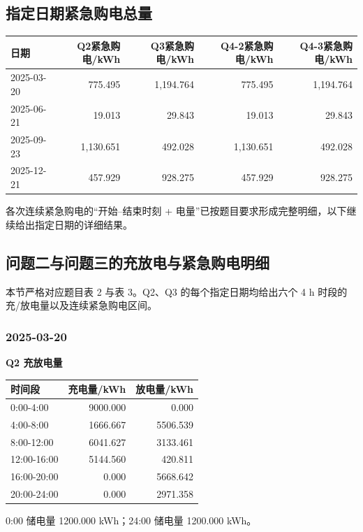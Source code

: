 \subsection{指定日期紧急购电总量}
\begin{longtable}[]{@{}lrrrr@{}}
\toprule
日期 & Q2紧急购电/kWh & Q3紧急购电/kWh & Q4-2紧急购电/kWh & Q4-3紧急购电/kWh \\
\midrule\endhead
2025-03-20 & 775.495 & 1,194.764 & 775.495 & 1,194.764 \\
2025-06-21 & 19.013 & 29.843 & 19.013 & 29.843 \\
2025-09-23 & 1,130.651 & 492.028 & 1,130.651 & 492.028 \\
2025-12-21 & 457.929 & 928.275 & 457.929 & 928.275 \\
\bottomrule\end{longtable}

各次连续紧急购电的``开始--结束时刻 + 电量''已按题目要求形成完整明细，以下继续给出指定日期的详细结果。

\subsection{问题二与问题三的充放电与紧急购电明细}
本节严格对应题目表 2 与表 3。Q2、Q3 的每个指定日期均给出六个 4 h 时段的充/放电量以及连续紧急购电区间。

\subsubsection{2025-03-20}
\textbf{Q2 充放电量}
\begin{longtable}[]{@{}lrr@{}}\toprule 时间段 & 充电量/kWh & 放电量/kWh \\\midrule\endhead
0:00-4:00 & 9000.000 & 0.000 \\
4:00-8:00 & 1666.667 & 5506.539 \\
8:00-12:00 & 6041.627 & 3133.461 \\
12:00-16:00 & 5144.560 & 420.811 \\
16:00-20:00 & 0.000 & 5668.642 \\
20:00-24:00 & 0.000 & 2971.358 \\
\bottomrule\end{longtable}
0:00 储电量 1200.000 kWh；24:00 储电量 1200.000 kWh。

